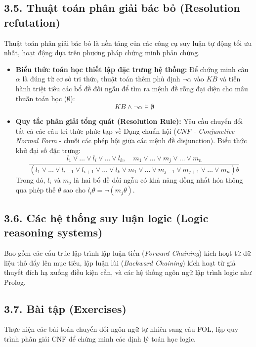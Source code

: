 \documentclass[11pt,a4paper]{article}
\begin{document}
\subsection{3.5. Thuật toán phân giải bác bỏ (Resolution refutation)}
Thuật toán phân giải bác bỏ là nền tảng của các công cụ suy luận tự động tối ưu nhất, hoạt động dựa trên phương pháp chứng minh phản chứng.
\begin{itemize}
    \item \textbf{Biểu thức toán học thiết lập đặc trưng hệ thống:} Để chứng minh câu $\alpha$ là đúng từ cơ sở tri thức, thuật toán thêm phủ định $\neg\alpha$ vào $KB$ và tiến hành triệt tiêu các bổ đề đối ngẫu để tìm ra mệnh đề rỗng đại diện cho mâu thuẫn toán học ($\emptyset$):
    \begin{equation}
        KB \wedge \neg\alpha \models \emptyset
    \end{equation}
    \item \textbf{Quy tắc phân giải tổng quát (Resolution Rule):} Yêu cầu chuyển đổi tất cả các câu tri thức phức tạp về Dạng chuẩn hội (\textit{CNF - Conjunctive Normal Form} - chuỗi các phép hội giữa các mệnh đề disjunction). Biểu thức khử đại số đặc trưng:
    \begin{equation}
        \frac{l_1 \vee \dots \vee l_i \vee \dots \vee l_k, \quad m_1 \vee \dots \vee m_j \vee \dots \vee m_n}{(l_1 \vee \dots \vee l_{i-1} \vee l_{i+1} \vee \dots \vee l_k \vee m_1 \vee \dots \vee m_{j-1} \vee m_{j+1} \vee \dots \vee m_n)\theta}
    \end{equation}
    Trong đó, $l_i$ và $m_j$ là hai bổ đề đối ngẫu có khả năng đồng nhất hóa thông qua phép thế $\theta$ sao cho $l_i\theta = \neg (m_j\theta)$.
\end{itemize}

\subsection{3.6. Các hệ thống suy luận logic (Logic reasoning systems)}
Bao gồm các cấu trúc lập trình lập luận tiến (\textit{Forward Chaining}) kích hoạt từ dữ liệu thô đẩy lên mục tiêu, lập luận lùi (\textit{Backward Chaining}) kích hoạt từ giả thuyết đích hạ xuống điều kiện cần, và các hệ thống ngôn ngữ lập trình logic như Prolog.

\subsection{3.7. Bài tập (Exercises)}
Thực hiện các bài toán chuyển đổi ngôn ngữ tự nhiên sang câu FOL, lập quy trình phân giải CNF để chứng minh các định lý toán học logic.
\end{document}
